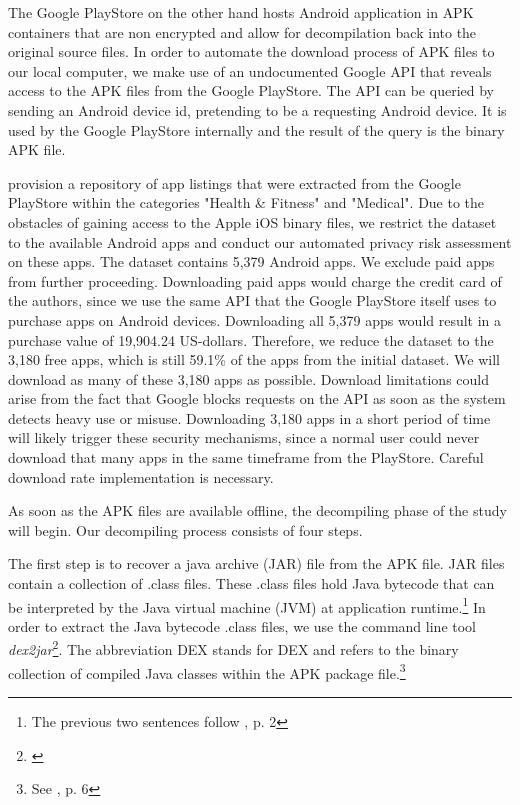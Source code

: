 \documentclass[
	a4paper,
	oneside,
	12pt,
	liststotocnumbered
]{article}
\let\cite\textcite
\begin{document}
The Google PlayStore on the other hand hosts Android application in \acs{APK} containers that are non encrypted and allow for decompilation back into the original source files. 
In order to automate the download process of \acs{APK} files to our local computer, we make use of an undocumented Google \acs{API} that reveals access to the \acs{APK} files from the Google PlayStore. 
The \acs{API} can be queried by sending an Android device id, pretending to be a requesting Android device. It is used by the Google PlayStore internally and the result of the query is the binary \acs{APK} file.

\cite{Xu2015} provision a repository of app listings that were extracted from the Google PlayStore within the categories "Health \& Fitness" and "Medical".
Due to the obstacles of gaining access to the Apple iOS binary files, we restrict the dataset to the available Android apps and conduct our automated privacy risk assessment on these apps.
The \cite{Xu2015} dataset contains 5,379 Android apps. 
We exclude paid apps from further proceeding. Downloading paid apps would charge the credit card of the authors, since we use the same \acs{API} that the Google PlayStore itself uses to purchase apps on Android devices. 
Downloading all 5,379 apps would result in a purchase value of 19,904.24 US-dollars. 
Therefore, we reduce the dataset to the 3,180 free apps, which is still 59.1\% of the apps from the initial dataset. 
We will download as many of these 3,180 apps as possible.
Download limitations could arise from the fact that Google blocks requests on the API as soon as the system detects heavy use or misuse. 
Downloading 3,180 apps in a short period of time will likely trigger these security mechanisms, since a normal user could never download that many apps in the same timeframe from the PlayStore.
Careful download rate implementation is necessary.

As soon as the \acs{APK} files are available offline, the decompiling phase of the study will begin.
Our decompiling process consists of four steps.

The first step is to recover a java archive (\acs{JAR}) file from the \acs{APK} file.
\acs{JAR} files contain a collection of .class files. 
These .class files hold Java bytecode that can be interpreted by the Java virtual machine (\acs{JVM}) at application runtime.\footnote{The previous two sentences follow \cite{Enck2011}, p. 2} 
In order to extract the Java bytecode .class files, we use the command line tool \textit{dex2jar}\footnote{\cite{Pan2010}}. 
The abbreviation \acs{DEX} stands for \acl{DEX} and refers to the binary collection of compiled Java classes within the \acs{APK} package file.\footnote{See \cite{xu2013techniques}, p. 6}
\end{document}

